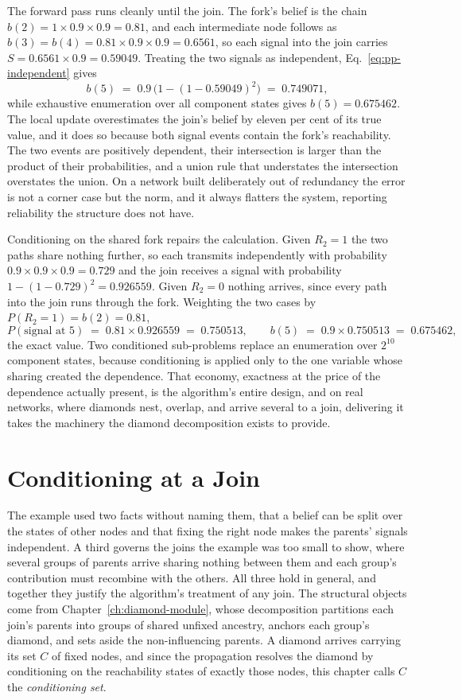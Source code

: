 \documentclass[12pt]{report}
\begin{document}
The forward pass runs cleanly until the join. The fork's belief is the chain $b(2) = 1 \times 0.9 \times 0.9 = 0.81$, and each intermediate node follows as $b(3) = b(4) = 0.81 \times 0.9 \times 0.9 = 0.6561$, so each signal into the join carries $S = 0.6561 \times 0.9 = 0.59049$. Treating the two signals as independent, Eq.~\eqref{eq:pp-independent} gives
\[
b(5) \;=\; 0.9\,\bigl(1 - (1 - 0.59049)^2\bigr) \;=\; 0.749071 ,
\]
while exhaustive enumeration over all component states gives $b(5) = 0.675462$. The local update overestimates the join's belief by eleven per cent of its true value, and it does so because both signal events contain the fork's reachability. The two events are positively dependent, their intersection is larger than the product of their probabilities, and a union rule that understates the intersection overstates the union. On a network built deliberately out of redundancy the error is not a corner case but the norm, and it always flatters the system, reporting reliability the structure does not have.

Conditioning on the shared fork repairs the calculation. Given $R_2 = 1$ the two paths share nothing further, so each transmits independently with probability $0.9 \times 0.9 \times 0.9 = 0.729$ and the join receives a signal with probability $1 - (1 - 0.729)^2 = 0.926559$. Given $R_2 = 0$ nothing arrives, since every path into the join runs through the fork. Weighting the two cases by $P(R_2 = 1) = b(2) = 0.81$,
\[
P(\text{signal at } 5) \;=\; 0.81 \times 0.926559 \;=\; 0.750513 ,
\qquad
b(5) \;=\; 0.9 \times 0.750513 \;=\; 0.675462 ,
\]
the exact value. Two conditioned sub-problems replace an enumeration over $2^{10}$ component states, because conditioning is applied only to the one variable whose sharing created the dependence. That economy, exactness at the price of the dependence actually present, is the algorithm's entire design, and on real networks, where diamonds nest, overlap, and arrive several to a join, delivering it takes the machinery the diamond decomposition exists to provide.

\section{Conditioning at a Join}
\label{sec:pp-conditioning}

The example used two facts without naming them, that a belief can be split over the states of other nodes and that fixing the right node makes the parents' signals independent. A third governs the joins the example was too small to show, where several groups of parents arrive sharing nothing between them and each group's contribution must recombine with the others. All three hold in general, and together they justify the algorithm's treatment of any join. The structural objects come from Chapter~\ref{ch:diamond-module}, whose decomposition partitions each join's parents into groups of shared unfixed ancestry, anchors each group's diamond, and sets aside the non-influencing parents. A diamond arrives carrying its set $C$ of fixed nodes, and since the propagation resolves the diamond by conditioning on the reachability states of exactly those nodes, this chapter calls $C$ the \emph{conditioning set}.
\end{document}
